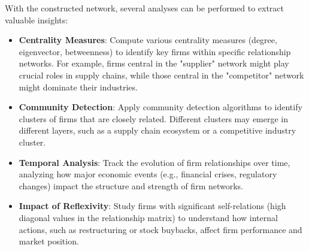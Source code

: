 With the constructed network, several analyses can be performed to extract valuable insights:
\begin{itemize}
    \item \textbf{Centrality Measures}: Compute various centrality measures (degree, eigenvector, betweenness) to identify key firms within specific relationship networks. For example, firms central in the "supplier" network might play crucial roles in supply chains, while those central in the "competitor" network might dominate their industries.
    \item \textbf{Community Detection}: Apply community detection algorithms to identify clusters of firms that are closely related. Different clusters may emerge in different layers, such as a supply chain ecosystem or a competitive industry cluster.
    \item \textbf{Temporal Analysis}: Track the evolution of firm relationships over time, analyzing how major economic events (e.g., financial crises, regulatory changes) impact the structure and strength of firm networks.
    \item \textbf{Impact of Reflexivity}: Study firms with significant self-relations (high diagonal values in the relationship matrix) to understand how internal actions, such as restructuring or stock buybacks, affect firm performance and market position.
\end{itemize}


%






